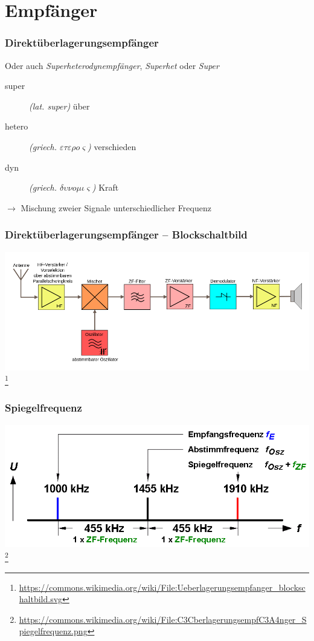 \section*{Empfänger}

\begin{frame}
  \frametitle{Direktüberlagerungsempfänger}
    Oder auch \emph{Superheterodynempfänger}, \emph{Superhet} oder \emph{Super}
    \begin{description}
      \item[super] \textit{(lat. super)} über
      \item[hetero] \textit{(griech. $\varepsilon\tau\varepsilon\rho o\varsigma$)} verschieden
      \item[dyn] \textit{(griech. $\delta\upsilon\nu o\mu\iota\varsigma$)} Kraft
    \end{description}
    $\rightarrow$ Mischung zweier Signale unterschiedlicher Frequenz
\end{frame}

\begin{frame}
    \frametitle{Direktüberlagerungsempfänger -- Blockschaltbild}
    \begin{center}
        \includegraphics[width=.99\textwidth]{e15/Ueberlagerungsempfanger_blockschaltbild.png}
        \footnote{\tiny \url{https://commons.wikimedia.org/wiki/File:Ueberlagerungsempfanger_blockschaltbild.svg}}
	\end{center}
\end{frame}

\begin{frame}
    \frametitle{Spiegelfrequenz}
    \begin{center}
        \includegraphics[width=.99\textwidth]{e15/Uberlagerungsempfanger_Spiegelfrequenz.png}
        \footnote{\tiny \url{https://commons.wikimedia.org/wiki/File:C3CberlagerungsempfC3A4nger_Spiegelfrequenz.png}}
	\end{center}
\end{frame}

